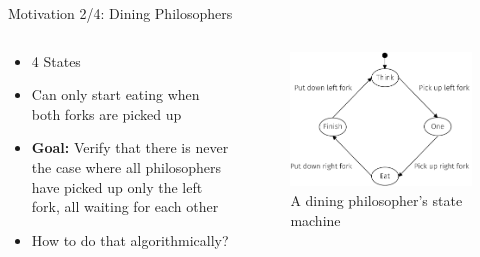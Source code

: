 \documentclass[aspectratio=169]{beamer}
\begin{document}
\begin{frame}{Motivation 2/4: Dining Philosophers}
    \begin{columns}
        \begin{column}{.5\textwidth}
            \begin{itemize}
                \item 4 States
                \item Can only start eating when both forks are picked up
                \item \textbf{Goal:} Verify that there is never the case where all philosophers have picked up only the left fork, all waiting for each other
                \item How to do that algorithmically?
            \end{itemize}
        \end{column}
        \begin{column}{.5\textwidth}
            \begin{figure}
                \includegraphics[width=\textwidth]{../figures/beamer-dining-philosopher-fsm}
                \caption{A dining philosopher's state machine}
                \label{fig:dining-philosopher-fsm}
            \end{figure}
        \end{column}
    \end{columns}
\end{frame}
\end{document}
